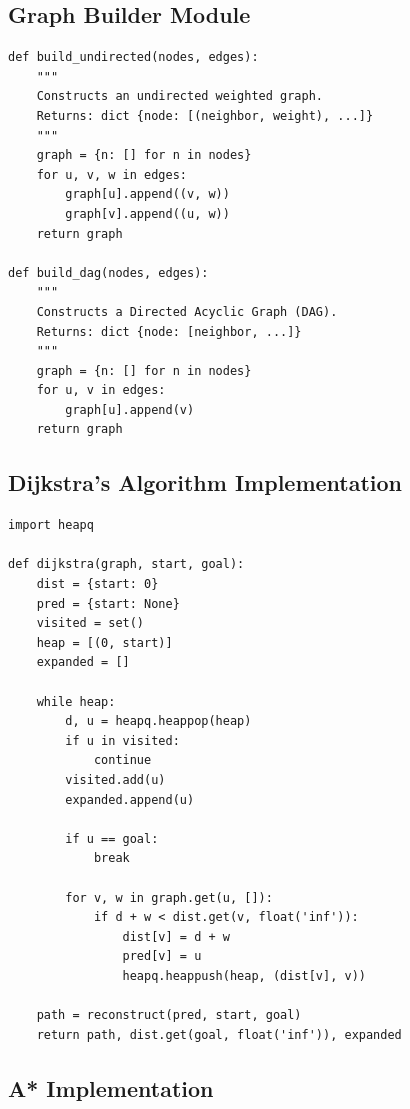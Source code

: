 \documentclass[12pt, a4paper, oneside]{report}
\theoremstyle{definition}
\begin{document}
\subsection{Graph Builder Module}

\begin{lstlisting}[caption={Graph builder for generic case studies (from core.utils)}, label={lst:graphgen}]
def build_undirected(nodes, edges):
    """
    Constructs an undirected weighted graph.
    Returns: dict {node: [(neighbor, weight), ...]}
    """
    graph = {n: [] for n in nodes}
    for u, v, w in edges:
        graph[u].append((v, w))
        graph[v].append((u, w))
    return graph

def build_dag(nodes, edges):
    """
    Constructs a Directed Acyclic Graph (DAG).
    Returns: dict {node: [neighbor, ...]}
    """
    graph = {n: [] for n in nodes}
    for u, v in edges:
        graph[u].append(v)
    return graph
\end{lstlisting}

\subsection{Dijkstra's Algorithm Implementation}

\begin{lstlisting}[caption={Dijkstra's algorithm with path reconstruction (from core.algorithms)}, label={lst:dijkstra}]
import heapq

def dijkstra(graph, start, goal):
    dist = {start: 0}
    pred = {start: None}
    visited = set()
    heap = [(0, start)]
    expanded = []
    
    while heap:
        d, u = heapq.heappop(heap)
        if u in visited: 
            continue
        visited.add(u)
        expanded.append(u)
        
        if u == goal: 
            break
            
        for v, w in graph.get(u, []):
            if d + w < dist.get(v, float('inf')):
                dist[v] = d + w
                pred[v] = u
                heapq.heappush(heap, (dist[v], v))
                
    path = reconstruct(pred, start, goal)
    return path, dist.get(goal, float('inf')), expanded
\end{lstlisting}

\subsection{A* Implementation}
\end{document}
